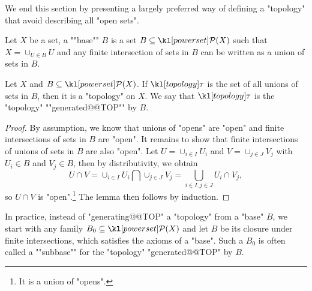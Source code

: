 \documentclass[main.tex]{subfiles}
\begin{document}
We end this section by presenting a largely preferred way of defining a "topology" that avoid describing all "open sets".
\begin{defn}[Base]%
	\AP Let $X$ be a set, a ""base"" $B$ is a set $B\subseteq \mP(X)$ such that $X = \cup_{U \in B} U$ and any finite intersection of sets in $B$ can be written as a union of sets in $B$. 
\end{defn}
\begin{prop}
	Let $X$ and $B \subseteq \mP(X)$. If $\topo$ is the set of all unions of sets in $B$, then it is a "topology" on $X$. We say that $\topo$ is the "topology" ""generated@@TOP"" by $B$.
\end{prop}
\begin{proof}
	By assumption, we know that unions of "opens" are "open" and finite intersections of sets in $B$ are "open". It remains to show that finite intersections of unions of sets in $B$ are also "open". Let $U = \cup_{i \in I} U_i$ and $V = \cup_{j \in J} V_j$ with $U_i \in B$ and $V_j \in B$, then by distributivity, we obtain
	\[U\cap V = \cup_{i \in I} U_i \bigcap \cup_{j \in J} V_j = \bigcup_{i\in I, j \in J} U_i \cap V_j,\]
	so $U \cap V$ is "open".\footnote{It is a union of "opens".} The lemma then follows by induction. %
\end{proof}
In practice, instead of "generating@@TOP" a "topology" from a "base" $B$, we start with any family $B_0 \subseteq \mP(X)$ and let $B$ be its closure under finite intersections, which satisfies the axioms of a "base". Such a $B_0$ is often called a ""subbase"" for the "topology" "generated@@TOP" by $B$.
\end{document}
